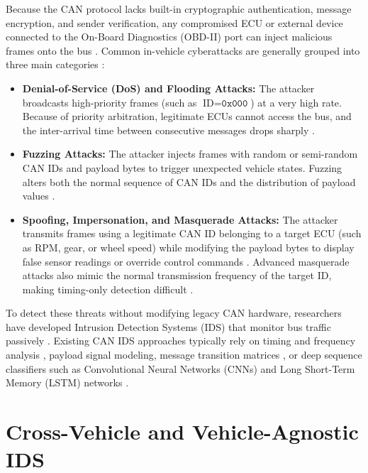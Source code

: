 \documentclass[12pt, a4paper, reqno, oneside]{book}
\begin{document}
Because the CAN protocol lacks built-in cryptographic authentication, message encryption, and sender verification, any compromised ECU or external device connected to the On-Board Diagnostics (OBD-II) port can inject malicious frames onto the bus \cite{lee2017otids, dupont2019automotive}. Common in-vehicle cyberattacks are generally grouped into three main categories \cite{song2020invehicle, lee2017otids, dupont2019automotive}:
\begin{itemize}
    \item \textbf{Denial-of-Service (DoS) and Flooding Attacks:} The attacker broadcasts high-priority frames (such as $\text{ID} = \texttt{0x000}$) at a very high rate. Because of priority arbitration, legitimate ECUs cannot access the bus, and the inter-arrival time between consecutive messages drops sharply \cite{song2020invehicle, neto2024ciciov2024}.
    \item \textbf{Fuzzing Attacks:} The attacker injects frames with random or semi-random CAN IDs and payload bytes to trigger unexpected vehicle states. Fuzzing alters both the normal sequence of CAN IDs and the distribution of payload values \cite{lee2017otids, dupont2019automotive}.
    \item \textbf{Spoofing, Impersonation, and Masquerade Attacks:} The attacker transmits frames using a legitimate CAN ID belonging to a target ECU (such as RPM, gear, or wheel speed) while modifying the payload bytes to display false sensor readings or override control commands \cite{song2020invehicle, rajapaksha2024canmirgu, neto2024ciciov2024}. Advanced masquerade attacks also mimic the normal transmission frequency of the target ID, making timing-only detection difficult \cite{dupont2019automotive}.
\end{itemize}

To detect these threats without modifying legacy CAN hardware, researchers have developed Intrusion Detection Systems (IDS) that monitor bus traffic passively \cite{song2020invehicle, lee2017otids}. Existing CAN IDS approaches typically rely on timing and frequency analysis \cite{lee2017otids}, payload signal modeling, message transition matrices \cite{islam2020graph, meng2023gbids}, or deep sequence classifiers such as Convolutional Neural Networks (CNNs) and Long Short-Term Memory (LSTM) networks \cite{song2020invehicle, tariq2020cantransfer}.

\section{Cross-Vehicle and Vehicle-Agnostic IDS}
\label{subsec:cross_vehicle_ids}
\end{document}
